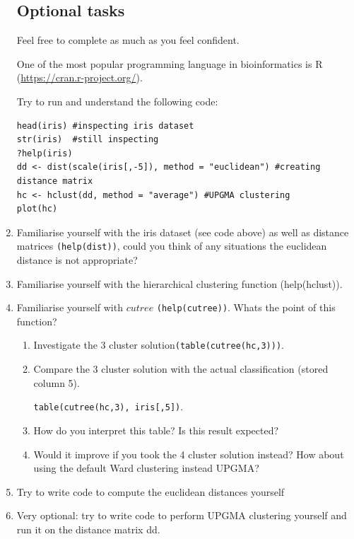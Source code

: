 \documentclass[11pt,runningheads,a4paper]{article}
\begin{document}
\begin{enumerate}
\subsection*{Optional tasks}
Feel free to complete as much as you feel confident.

One of the most popular programming language in bioinformatics is R (\url{https://cran.r-project.org/}).

Try to run and understand the following code:


\lstset{language=S,style=customc}
\begin{lstlisting}
head(iris) #inspecting iris dataset
str(iris)  #still inspecting
?help(iris)
dd <- dist(scale(iris[,-5]), method = "euclidean") #creating distance matrix
hc <- hclust(dd, method = "average") #UPGMA clustering
plot(hc)
\end{lstlisting}

\item Familiarise yourself with the iris dataset (see code above) as well as distance matrices \lstinline{(help(dist))}, could you think of any situations the euclidean distance is not appropriate?
\item Familiarise yourself with the hierarchical clustering function (help(hclust)).
\item Familiarise yourself with $cutree$ \lstinline{(help(cutree))}. Whats the point of this function?

\begin{enumerate}
  \item Investigate the 3 cluster solution\lstinline{(table(cutree(hc,3)))}.
\item Compare the 3 cluster solution with the actual classification (stored column 5).

  \lstinline{table(cutree(hc,3), iris[,5])}.
\item How do you interpret this table? Is this result expected?
\item Would it improve if you took the 4 cluster solution instead? How about using the default Ward clustering instead UPGMA?
\end{enumerate}

\item Try to write code to compute the euclidean distances yourself
\item Very optional: try to write code to perform UPGMA clustering yourself and run it on the distance matrix dd.
\end{enumerate}
\end{document}
